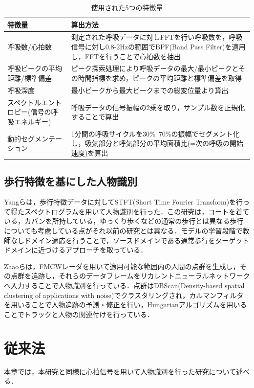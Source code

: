 \begin{table}[H]
\caption{使用された5つの特徴量}
\centering
\begin{tabular}{|p{3cm}|p{6cm}|}
\hline
特徴量 & 算出方法 \\
\hline
呼吸数/心拍数 & 測定された呼吸データに対しFFTを行い呼吸数を，呼吸信号に対し0.8-2Hzの範囲でBPF(Band Pass Filter)を適用し，FFTを行うことで心拍数を抽出 \\ \hline
呼吸ピークの平均距離/標準偏差 & ピーク探索処理により呼吸データの最大/最小ピークとその時間指標を求め，ピークの平均距離と標準偏差を取得 \\ \hline
呼吸深度 & 最小ピークから最大ピークまでの総変位量より算出 \\ \hline
スペクトルエントロピー(信号の呼吸エネルギー) & 呼吸データの信号振幅の2乗を取り，サンプル数を正規化することで算出 \\ \hline
動的セグメンテーション & 1分間の呼吸サイクルを30\%~70\%の振幅でセグメント化し，吸気部分と呼気部分の平均面積比(=次の呼吸の開始速度)を算出 \\
\hline
\end{tabular}
\label{table:respi}
\end{table}


\section{歩行特徴を基にした人物識別}
Yangらは，歩行特徴データに対してSTFT(Short Time Fourier Transform)を行って得たスペクトログラムを用いて人物識別を行った\cite{paper:unsupervised}．この研究は，コートを着ている，カバンを所持している，ゆっくり歩くなどの通常の歩行とは異なる歩行についても考慮している点がそれ以前の研究とは異なる．モデルの学習段階で教師なしドメイン適応を行うことで，ソースドメインである通常歩行をターゲットドメインに近づけるアプローチを取っている．

Zhaoらは，FMCWレーダを用いて適用可能な範囲内の人間の点群を生成し，その点群を追跡し，それらのデータフレームをリカレントニューラルネットワークへ入力することで人物識別を行っている\cite{paper:human_track}．点群はDBScan(Density-based spatial clustering of applications with noise)\cite{paper:dbscan}でクラスタリングされ，カルマンフィルタ\cite{paper:kalman}を用いることで人物追跡の予測・修正を行い，Hungarianアルゴリズム\cite{paper:Hungarian}を用いることでトラックと人物の関連付けを行っている．

\chapter{従来法}
本章では，本研究と同様に心拍信号を用いて人物識別を行った研究について述べる．

